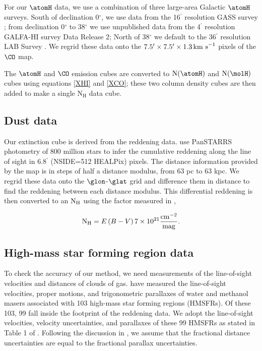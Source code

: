 For our $\atomH$ data, we use a combination of three large-area Galactic $\atomH$ surveys. 
South of declination 0$^\circ$, we use data from the 16$^\prime$ resolution GASS survey \citep{Kalberla_2010}; from declination 0$^\circ$ to 38$^\circ$ we use unpublished data from the 4$^\prime$ resolution GALFA-HI survey \citep{Peek_2011} Data Release 2; North of 38$^\circ$ we default to the 36$^\prime$ resolution LAB Survey \citep{Kalberla_2005}. 
We regrid these data onto the $7.5^\prime \times 7.5^\prime \times 1.3 {\rm \, km~s}^{-1}$ pixels of the \citet{Dame_2001} $\CO$ map.

The $\atomH$ and $\CO$ emission cubes are converted to ${\rm N}(\atomH)$ and ${\rm N}(\molH)$ cubes using equations \ref{XHI} and \ref{XCO}; these two column density cubes are then added to make a single $\mathrm{N_H}$ data cube.


\subsection{Dust data}

Our extinction cube is derived from the \citet{Green_2015} reddening data. 
\citet{Green_2015} use PanSTARRS photometry of 800 million stars to infer the cumulative reddening along the line of sight in 6.8$^\prime$ (NSIDE=512 HEALPix) pixels. 
The distance information provided by the \citet{Green_2015} map is in steps of half a distance modulus, from 63 pc to 63 kpc. 
We regrid these data onto the \citet{Dame_2001} $\glon$-$\glat$ grid and difference them in distance to find the reddening between each distance modulus. 
This differential reddening is then converted to an ${\rm N_H}$ using the factor measured in \citet{Peek_2013}, 

\begin{equation}
\mathrm{N_H} = E\left(B-V\right) 7 \times 10^{21} \frac{\rm cm^{-2} }{\rm mag}. 
\end{equation}


\subsection{High-mass star forming region data}
\label{sec:data-HMSFR}
To check the accuracy of our method, we need measurements of the line-of-sight velocities and distances of clouds of gas. 
\Reid{} have measured the line-of-sight velocities, proper motions, and trigonometric parallaxes of water and methanol masers associated with 103 high-mass star forming regions (HMSFRs). 
Of these 103, 99 fall inside the footprint of the \citet{Green_2015} reddening data. 
We adopt the line-of-sight velocities, velocity uncertainties, and parallaxes of these 99 HMSFRs as stated in Table 1 of \Reid{}. 
Following the discussion in \citet{2009ApJ...704.1704B}, we assume that the fractional distance uncertainties are equal to the fractional parallax uncertainties. 
